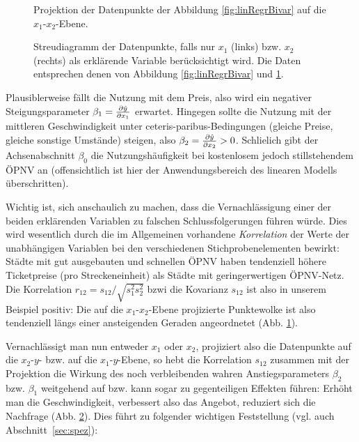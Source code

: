 \begin{figure}
\caption{\label{fig:linRegrBivar-xy} Projektion der Datenpunkte der
Abbildung \protect\ref{fig:linRegrBivar} auf die $x_1$-$x_2$-Ebene.
}
\end{figure}

\begin{figure}
\caption{\label{fig:linRegrBivar-xz-yz} Streudiagramm der Datenpunkte,
falls nur $x_1$
(links) bzw. $x_2$ (rechts) als erkl\"arende Variable ber\"ucksichtigt
wird. Die Daten entsprechen denen von
Abbildung \protect\ref{fig:linRegrBivar} und \protect\ref{fig:linRegrBivar-xy}.
}
\end{figure}


Plausiblerweise f\"allt die Nutzung mit dem Preis, also wird ein negativer
Steigungsparameter $\beta_1=\frac{\partial \hat{y}}{\partial x_1}$ erwartet. Hingegen
sollte die Nutzung mit der mittleren Geschwindigkeit unter
ceteris-paribus-Bedingungen (gleiche Preise, gleiche sonstige
Umst\"ande) steigen, also
$\beta_2=\frac{\partial \hat{y}}{\partial x_2}>0$. Schlie\3lich gibt der
Achsenabschnitt $\beta_0$ die Nutzungsh\"aufigkeit bei kostenlosem
jedoch stillstehendem \"OPNV an (offensichtlich ist hier der
Anwendungsbereich des linearen Modells \"uberschritten). 

Wichtig ist, sich anschaulich zu machen, dass die Vernachl\"assigung
einer der beiden erkl\"arenden Variablen zu falschen
Schlussfolgerungen f\"uhren w\"urde. Dies wird wesentlich durch die
im Allgemeinen vorhandene \textit{Korrelation} der Werte der unabh\"angigen
Variablen bei den verschiedenen Stichprobenelementen bewirkt: St\"adte
mit gut ausgebauten und schnellen \"OPNV haben tendenziell 
h\"ohere Ticketpreise (pro Streckeneinheit) als St\"adte mit
geringerwertigen \"OPNV-Netz. Die Korrelation 
$r_{12}=s_{12}/\sqrt{s_1^2s_2^2}$ bzwi die Kovarianz $s_{12}$ ist also in
unserem Beispiel 
positiv: Die auf die $x_1$-$x_2$-Ebene projizierte Punktewolke 
ist also tendenziell l\"angs einer ansteigenden
Geraden  angeordnetet (Abb. \ref{fig:linRegrBivar-xy}).

Vernachl\"assigt man nun entweder $x_1$ oder $x_2$, projiziert also
die Datenpunkte auf die $x_2$-$y$- bzw. auf die $x_1$-$y$-Ebene, so hebt die
Korrelation $s_{12}$ zusammen mit der Projektion
die Wirkung des noch verbleibenden
wahren Anstiegsparameters $\beta_2$ bzw. $\beta_1$ weitgehend auf
bzw. kann sogar 
zu gegenteiligen Effekten f\"uhren: Erh\"oht man die Geschwindigkeit,
verbessert also das Angebot, reduziert sich die Nachfrage
(Abb. \ref{fig:linRegrBivar-xz-yz}). Dies f\"uhrt zu folgender
wichtigen Feststellung (vgl. auch Abschnitt~\ref{sec:spez}):

